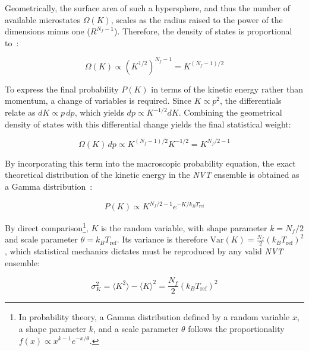 Geometrically, the surface area of such a hypersphere, and thus the number of available microstates $\Omega(K)$, scales as the radius raised to the power of the dimensions minus one ($R^{N_f - 1}$). Therefore, the density of states is proportional to~\cite{mec_estadistica}:

\begin{equation}
    \Omega(K) \propto (K^{1/2})^{N_f - 1} = K^{(N_f - 1)/2}
\end{equation}

 To express the final probability $P(K)$ in terms of the kinetic energy rather than momentum, a change of variables is required. Since $K \propto p^2$, the differentials relate as $dK \propto p\,dp$, which yields $dp \propto K^{-1/2} dK$. Combining the geometrical density of states with this differential change yields the final statistical weight:

\begin{equation}
    \Omega(K) \, dp \propto K^{(N_f - 1)/2} K^{-1/2} = K^{N_f/2 - 1}
\end{equation}

By incorporating this term into the macroscopic probability equation, the exact theoretical distribution of the kinetic energy in the \textit{NVT} ensemble is obtained as a Gamma distribution~\cite{gamma}:

\begin{equation}\label{eq:gamma_distribution}
    P(K) \propto K^{N_f/2 - 1} e^{-K / k_B T_{\text{ref}}}
\end{equation}

 By direct comparison\footnote{In probability theory, a Gamma distribution defined by a random variable $x$, a shape parameter $k$, and a scale parameter $\theta$ follows the proportionality $f(x) \propto x^{k-1} e^{-x/\theta}$.}, $K$ is the random variable, with shape parameter $k = N_f/2$ and scale parameter $\theta = k_B T_{\text{ref}}$. Its variance is therefore $\mathrm{Var}(K) = \frac{N_f}{2}(k_B T_{\text{ref}})^2$, which statistical mechanics dictates must be reproduced by any valid \textit{NVT} ensemble:

\begin{equation}\label{eq:variance_k}
    \sigma_K^2 = \langle K^2 \rangle - \langle K \rangle^2 = \frac{N_f}{2} (k_B T_{\text{ref}})^2
\end{equation}

